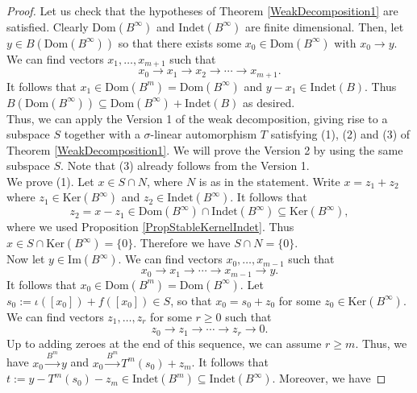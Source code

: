 \documentclass[12pt]{amsart}
\theoremstyle{definition}
\newcommand{\<}{\langle}   %
\renewcommand{\>}{\rangle} %
\begin{document}
\begin{proof}
Let us check that the hypotheses of Theorem \ref{WeakDecomposition1} are satisfied. Clearly $\mathrm{Dom}(B^{\infty})$ and $\mathrm{Indet}(B^{\infty})$ are finite dimensional. Then, let $y \in B(\mathrm{Dom}(B^{\infty}))$ so that there exists some $x_0 \in \mathrm{Dom}(B^{\infty})$ with $x_0\to y$. We can find vectors $x_1,\ldots, x_{m+1}$ such that 
\begin{equation*}
    x_0 \to x_1 \to x_2 \to \cdots \to x_{m+1}.
\end{equation*}
It follows that $x_1 \in \mathrm{Dom}(B^m) = \mathrm{Dom}(B^{\infty})$ and $y-x_1 \in \mathrm{Indet}(B)$. Thus $B(\mathrm{Dom}(B^{\infty})) \subseteq  \mathrm{Dom}(B^{\infty}) + \mathrm{Indet}(B)$ as desired.\\
Thus, we can apply the Version 1 of the weak decomposition, giving rise to a subspace $S$ together with a $\sigma$-linear automorphism $T$ satisfying (1), (2) and (3) of Theorem \ref{WeakDecomposition1}. We will prove the Version 2 by using the same subspace $S$. Note that (3) already follows from the Version 1.\\
We prove (1). Let $x \in S \cap N$, where $N$ is as in the statement. Write $x = z_1+z_2$ where $z_1 \in \mathrm{Ker}(B^{\infty})$ and $z_2 \in \mathrm{Indet}(B^{\infty})$. It follows that 
\begin{equation*}
    z_2 = x-z_1 \in \mathrm{Dom}(B^{\infty})\cap \mathrm{Indet}(B^{\infty}) \subseteq  \mathrm{Ker}(B^{\infty}),
\end{equation*}
where we used Proposition \ref{PropStableKernelIndet}. Thus $x \in S \cap \mathrm{Ker}(B^{\infty}) = \{0\}$. Therefore we have $S \cap N = \{0\}$.\\
Now let $y \in \mathrm{Im}(B^{\infty})$. We can find vectors $x_0,\ldots ,x_{m-1}$ such that 
\begin{equation*}
    x_0 \to x_1 \to \cdots \to x_{m-1} \to y.
\end{equation*}
It follows that $x_0 \in \mathrm{Dom}(B^{m}) = \mathrm{Dom}(B^{\infty})$. Let $s_0 := \iota([x_0]) + f([x_0]) \in S$, so that $x_0 = s_0 + z_0$ for some $z_0 \in \mathrm{Ker}(B^{\infty})$. We can find vectors $z_1,\ldots, z_r$ for some $r\geq 0$ such that 
\begin{equation*}
    z_0 \to z_1 \to \cdots \to z_r \to 0.
\end{equation*}
Up to adding zeroes at the end of this sequence, we can assume $r\geq m$. Thus, we have $x_0 \xrightarrow{B^m} y$ and $x_0 \xrightarrow{B^m} T^m(s_0)+z_m$. It follows that $t:= y - T^m(s_0) - z_m \in \mathrm{Indet}(B^m) \subseteq  \mathrm{Indet}(B^{\infty}).$ Moreover, we have 

\end{proof}
\end{document}
